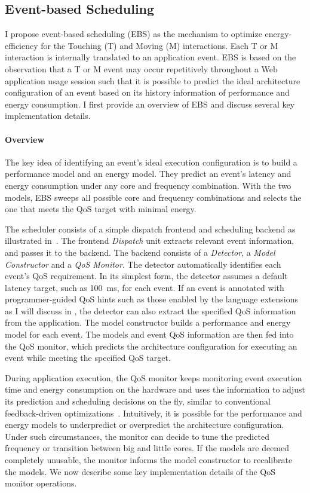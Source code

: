 \subsection{Event-based Scheduling}
\label{sec:runtime:ebs}

I propose event-based scheduling (EBS) as the mechanism to optimize energy-efficiency for the Touching (T) and Moving (M) interactions. Each T or M interaction is internally translated to an application event. EBS is based on the observation that a T or M event may occur repetitively throughout a Web application usage session such that it is possible to predict the ideal architecture configuration of an event based on its history information of performance and energy consumption. I first provide an overview of EBS and discuss several key implementation details.

\paragraph{Overview} The key idea of identifying an event's ideal execution configuration is to build a performance model and an energy model. They predict an event's latency and energy consumption under any core and frequency combination. With the two models, EBS sweeps all possible core and frequency combinations and selects the one that meets the QoS target with minimal energy.

The scheduler consists of a simple dispatch frontend and scheduling backend as illustrated in~. The frontend \textit{Dispatch} unit extracts relevant event information, and passes it to the backend. The backend consists of a \textit{Detector}, a \textit{Model Constructor} and a \textit{QoS Monitor}. The detector
automatically identifies each event's QoS requirement. In its simplest form, the detector assumes a default latency target, such as 100~ms, for each event. If an event is annotated with programmer-guided QoS hints such as those enabled by the \greenweb language extensions as I will discuss in , the detector can also extract the specified QoS information from the application. The model constructor builds a performance and energy model for each event. The models and event QoS information are then fed into the QoS monitor, which predicts the architecture configuration for executing an event while meeting the specified QoS target.

During application execution, the QoS monitor keeps monitoring event execution time and energy consumption on the hardware and uses the information to adjust its prediction and scheduling decisions on the fly, similar to conventional feedback-driven optimizations~\cite{FDO}. Intuitively, it is possible for the performance and energy models to underpredict or overpredict the architecture configuration. Under such circumstances, the monitor can decide to tune the predicted frequency or transition between big and little cores. If the models are deemed completely unusable, the monitor informs the model constructor to recalibrate the models. We now describe some key implementation details of the QoS monitor operations.

